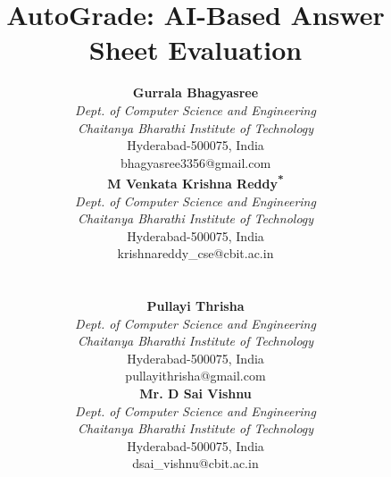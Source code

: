 \documentclass[conference]{IEEEtran}
\begin{document}
\title{AutoGrade: AI-Based Answer Sheet Evaluation\\}

\author{
\begin{minipage}[t]{0.45\textwidth}
\centering
\textbf{Gurrala Bhagyasree} \\
\textit{Dept. of Computer Science and Engineering} \\
\textit{Chaitanya Bharathi Institute of Technology}\\
Hyderabad-500075, India \\
bhagyasree3356@gmail.com
\end{minipage}
\hfill
\begin{minipage}[t]{0.45\textwidth}
\centering
\textbf{M Venkata Krishna Reddy\textsuperscript{*}} \\
\textit{Dept. of Computer Science and Engineering} \\
\textit{Chaitanya Bharathi Institute of Technology}\\
Hyderabad-500075, India \\
krishnareddy\_cse@cbit.ac.in
\end{minipage}
\vspace{0.5cm} \\
\begin{minipage}[t]{0.45\textwidth}
\centering
\textbf{Pullayi Thrisha} \\
\textit{Dept. of Computer Science and Engineering} \\
\textit{Chaitanya Bharathi Institute of Technology}\\
Hyderabad-500075, India \\
pullayithrisha@gmail.com
\end{minipage}
\hfill
\begin{minipage}[t]{0.45\textwidth}
\centering
\textbf{Mr. D Sai Vishnu} \\
\textit{Dept. of Computer Science and Engineering} \\
\textit{Chaitanya Bharathi Institute of Technology}\\
Hyderabad-500075, India \\
dsai\_vishnu@cbit.ac.in
\end{minipage}
}

\maketitle
\end{document}
